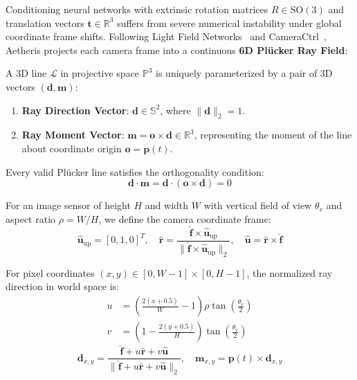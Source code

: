 \documentclass[10pt,twocolumn,letterpaper]{article}
\begin{document}
Conditioning neural networks with extrinsic rotation matrices $R \in \mathrm{SO}(3)$ and translation vectors $\mathbf{t} \in \mathbb{R}^3$ suffers from severe numerical instability under global coordinate frame shifts. Following Light Field Networks~\cite{sitzmann2021light} and CameraCtrl~\cite{he2024cameractrl}, Aetheris projects each camera frame into a continuous \textbf{6D Pl\"ucker Ray Field}:

A 3D line $\mathcal{L}$ in projective space $\mathbb{P}^3$ is uniquely parameterized by a pair of 3D vectors $(\mathbf{d}, \mathbf{m})$:
\begin{enumerate}
    \item \textbf{Ray Direction Vector}: $\mathbf{d} \in \mathbb{S}^2$, where $\|\mathbf{d}\|_2 = 1$.
    \item \textbf{Ray Moment Vector}: $\mathbf{m} = \mathbf{o} \times \mathbf{d} \in \mathbb{R}^3$, representing the moment of the line about coordinate origin $\mathbf{o} = \mathbf{p}(t)$.
\end{enumerate}

Every valid Pl\"ucker line satisfies the orthogonality condition:
\begin{equation}
\mathbf{d} \cdot \mathbf{m} = \mathbf{d} \cdot (\mathbf{o} \times \mathbf{d}) = 0
\end{equation}

For an image sensor of height $H$ and width $W$ with vertical field of view $\theta_v$ and aspect ratio $\rho = W/H$, we define the camera coordinate frame:
\begin{equation}
\hat{\mathbf{u}}_{\text{up}} = [0, 1, 0]^T, \quad \hat{\mathbf{r}} = \frac{\hat{\mathbf{f}} \times \hat{\mathbf{u}}_{\text{up}}}{\|\hat{\mathbf{f}} \times \hat{\mathbf{u}}_{\text{up}}\|_2}, \quad \hat{\mathbf{u}} = \hat{\mathbf{r}} \times \hat{\mathbf{f}}
\end{equation}

For pixel coordinates $(x, y) \in [0, W-1] \times [0, H-1]$, the normalized ray direction in world space is:
\begin{align}
u &= \left(\frac{2(x + 0.5)}{W} - 1\right) \rho \tan\left(\frac{\theta_v}{2}\right) \\
v &= \left(1 - \frac{2(y + 0.5)}{H}\right) \tan\left(\frac{\theta_v}{2}\right)
\end{align}
\begin{equation}
\mathbf{d}_{x,y} = \frac{\hat{\mathbf{f}} + u\hat{\mathbf{r}} + v\hat{\mathbf{u}}}{\|\hat{\mathbf{f}} + u\hat{\mathbf{r}} + v\hat{\mathbf{u}}\|_2}, \quad \mathbf{m}_{x,y} = \mathbf{p}(t) \times \mathbf{d}_{x,y}
\end{equation}
\end{document}

